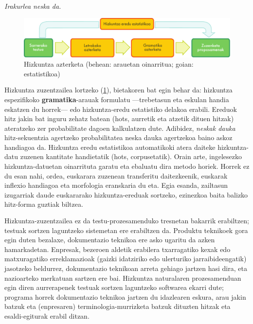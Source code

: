 \begin{multicols}{2}
\hspace{10pt}\textit{Irakurlea neska da.} 
 \begin{figure}[htb]
  \center
  \includegraphics[width=\textwidth]{../_media/basque/language_checking}
  \caption{Hizkuntza azterketa (behean: arauetan oinarritua; goian: estatistikoa)}
  \label{fig:langcheckingaarch_eu}
\end{figure}

Hizkuntza zuzentzailea lortzeko (\ref{fig:langcheckingaarch_eu}), bietakoren bat egin behar da: hizkuntza espezifikoko \textbf{gramatika}-arauak formulatu —trebetasun eta eskulan handia eskatzen du horrek— edo hizkuntza-eredu estatistiko delakoa erabili. Ereduok hitz jakin bat inguru zehatz batean (hots, aurretik eta atzetik dituen hitzak) ateratzeko zer probabilitate dagoen kalkulatzen dute. Adibidez, \textit{neskak dauka} hitz-sekuentzia agertzeko probabilitatea neska dauka agertzekoa baino askoz handiagoa da. Hizkuntza eredu estatistikoa automatikoki atera daiteke hizkuntza-datu zuzenen kantitate handietatik (hots, corpusetatik). Orain arte, ingelesezko hizkuntza-datuetan oinarrituta garatu eta ebaluatu dira metodo horiek. Horrek ez du esan nahi, ordea, euskarara zuzenean transferitu daitezkeenik, euskarak inflexio handiagoa eta morfologia eranskaria du eta. Egia esanda, zailtasun izugarriak daude euskararako hizkuntza-ereduak sortzeko, ezinezkoa baita balizko hitz-forma guztiak biltzea. 

Hizkuntza-zuzentzailea ez da testu-prozesamenduko tresnetan bakarrik erabiltzen; testuak sortzen laguntzeko sistemetan ere erabiltzen da. Produktu teknikoek gora egin duten bezalaxe, dokumentazio teknikoa ere asko ugaritu da azken hamarkadetan. Enpresak, bezeroen aldetik erabilera txarragatiko kexak edo matxuragatiko erreklamazioak (gaizki idatziriko edo ulerturiko jarraibideengatik) jasotzeko beldurrez, dokumentazio teknikoan arreta gehiago jartzen hasi dira, eta nazioarteko merkatuan sartzen ere bai. Hizkuntza naturalaren prozesamenduan egin diren aurrerapenek testuak sortzen laguntzeko softwarea ekarri dute; programa horrek dokumentazio teknikoa jartzen du idazlearen eskura, arau jakin batzuk eta (enpresaren) terminologia-murrizketa batzuk dituzten hitzak eta esaldi-egiturak erabil ditzan. 


\end{multicols}
